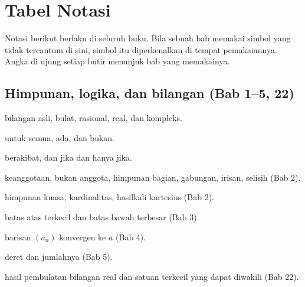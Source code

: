\appendix
\renewcommand{\appendixname}{Lampiran}
\chapter{Tabel Notasi}
\label{app:notasi}

Notasi berikut berlaku di seluruh buku. Bila sebuah bab memakai simbol yang tidak
tercantum di sini, simbol itu diperkenalkan di tempat pemakaiannya. Angka di ujung
setiap butir menunjuk bab yang memakainya.

\section*{Himpunan, logika, dan bilangan (Bab 1--5, 22)}
\begin{description}[style=nextline,itemsep=0.25em]
  \item[$\mathbb{N}$, $\mathbb{Z}$, $\mathbb{Q}$, $\mathbb{R}$, $\mathbb{C}$]
        bilangan asli, bulat, rasional, real, dan kompleks.
  \item[$\forall$, $\exists$, $\neg$] untuk semua, ada, dan bukan.
  \item[$\Rightarrow$, $\Leftrightarrow$] berakibat, dan jika dan hanya jika.
  \item[$\in$, $\notin$, $\subseteq$, $\cup$, $\cap$, $\setminus$] keanggotaan,
        bukan anggota, himpunan bagian, gabungan, irisan, selisih (Bab 2).
  \item[$\mathcal{P}(S)$, $|S|$, $S\times T$] himpunan kuasa, kardinalitas,
        hasilkali kartesius (Bab 2).
  \item[$\sup S$, $\inf S$] batas atas terkecil dan batas bawah terbesar (Bab 3).
  \item[$a_n\to a$] barisan $(a_n)$ konvergen ke $a$ (Bab 4).
  \item[$\sum_{n=1}^{\infty} a_n$] deret dan jumlahnya (Bab 5).
  \item[$\mathrm{fl}(x)$, $\mathrm{ulp}$] hasil pembulatan bilangan real dan satuan
        terkecil yang dapat diwakili (Bab 22).
\end{description}


